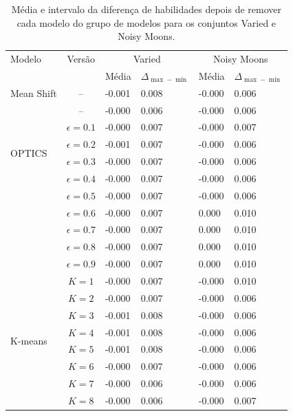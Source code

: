 \begin{table}[!t]
    \centering
    \tiny
    \caption{Média e intervalo da diferença de habilidades depois de remover cada modelo do grupo de modelos para os conjuntos  Varied e Noisy Moons.}
    \label{tab:metrics_varied_noisy_moons}
    \begin{tabular}{l|c|ll|ll}
    \midrule
    Modelo & Versão 
      & \multicolumn{2}{c|}{Varied} 
      & \multicolumn{2}{c}{Noisy Moons} \\
          &        
      & Média & $\Delta_{\max-\min}$ 
      & Média & $\Delta_{\max-\min}$ \\
    \midrule
    Mean Shift      & -- & -0.001 & 0.008 & -0.000 & 0.006 \\
    \midrule
    \multirow[t]{6}{*}{OPTICS} 
      & -- & -0.000 & 0.006 & -0.000 & 0.006    \\
    \midrule
    \multirow[t]{9}{*}{DBSCAN} 
      & $\epsilon=0.1$ & -0.000 & 0.007 & -0.000 & 0.007 \\
      & $\epsilon=0.2$ & -0.001 & 0.007 & -0.000 & 0.006 \\
      & $\epsilon=0.3$ & -0.000 & 0.007 & -0.000 & 0.006 \\
      & $\epsilon=0.4$ & -0.000 & 0.007 & -0.000 & 0.006 \\
      & $\epsilon=0.5$ & -0.000 & 0.007 & -0.000 & 0.006 \\
      & $\epsilon=0.6$ & -0.000 & 0.007 &  0.000 & 0.010 \\
      & $\epsilon=0.7$ & -0.000 & 0.007 &  0.000 & 0.010 \\
      & $\epsilon=0.8$ & -0.000 & 0.007 &  0.000 & 0.010 \\
      & $\epsilon=0.9$ & -0.000 & 0.007 &  0.000 & 0.010 \\
    \midrule
    \multirow[t]{8}{*}{K-means} 
      & $K=1$ & -0.000 & 0.007 & -0.000 & 0.010 \\
      & $K=2$ & -0.000 & 0.007 & -0.000 & 0.006 \\
      & $K=3$ & -0.001 & 0.008 & -0.000 & 0.006 \\
      & $K=4$ & -0.001 & 0.008 & -0.000 & 0.006 \\
      & $K=5$ & -0.001 & 0.008 & -0.000 & 0.006 \\
      & $K=6$ & -0.000 & 0.007 & -0.000 & 0.006 \\
      & $K=7$ & -0.000 & 0.006 & -0.000 & 0.006 \\
      & $K=8$ & -0.000 & 0.006 & -0.000 & 0.007 \\

\end{tabular}
\end{table}
